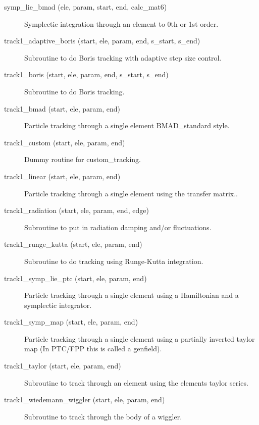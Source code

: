 \begin{description}

\item[symp\_lie\_bmad (ele, param, start, end, calc\_mat6)] \Newline
Symplectic integration through an element to 0th or 1st order.

\item[track1\_adaptive\_boris (start, ele, param, end, s\_start, s\_end)] \Newline
Subroutine to do Boris tracking with adaptive step size control. 

\item[track1\_boris (start, ele, param, end, s\_start, s\_end)] \Newline
Subroutine to do Boris tracking.  

\item[track1\_bmad (start, ele, param, end)] \Newline
Particle tracking through a single element BMAD\_standard style. 

\item[track1\_custom (start, ele, param, end)] \Newline
Dummy routine for custom\_tracking.

\item[track1\_linear (start, ele, param, end)] \Newline
Particle tracking through a single element using the transfer matrix.. 

\item[track1\_radiation (start, ele, param, end, edge)] \Newline
Subroutine to put in radiation damping and/or fluctuations. 

\item[track1\_runge\_kutta (start, ele, param, end)] \Newline
Subroutine to do tracking using Runge-Kutta integration. 

\item[track1\_symp\_lie\_ptc (start, ele, param, end)] \Newline
Particle tracking through a single element using a Hamiltonian and a 
symplectic integrator. 

\item[track1\_symp\_map (start, ele, param, end)] \Newline
Particle tracking through a single element using a partially inverted 
taylor map (In PTC/FPP this is called a genfield). 

\item[track1\_taylor (start, ele, param, end)] \Newline
Subroutine to track through an element using the elements taylor series. 

\item[track1\_wiedemann\_wiggler (start, ele, param, end)] \Newline
Subroutine to track through the body of a wiggler. 

\end{description}

